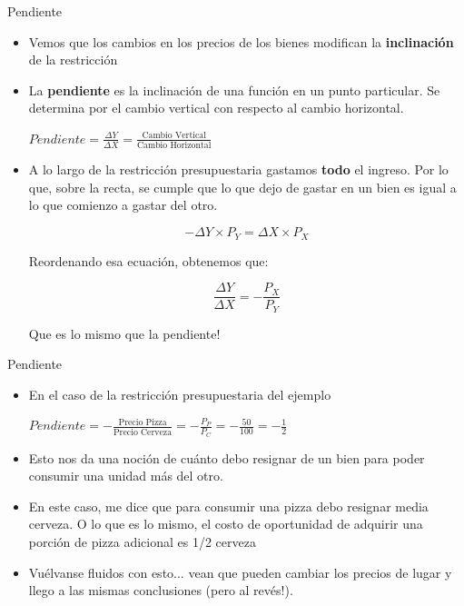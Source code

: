 \documentclass{beamer}
\begin{document}
    
\begin{frame}{Pendiente}
    \begin{itemize}
        \item Vemos que los cambios en los precios de los bienes modifican la \textbf{inclinación} de la restricción 
        \item La \textbf{pendiente} es la inclinación de una función en un punto particular. Se determina por el cambio vertical con respecto al cambio horizontal. \\ 
         \begin{center}
            $Pendiente =\frac{\Delta Y}{\Delta X} = \frac{\text{Cambio Vertical}}
        {\text{Cambio Horizontal}}$
        \end{center}
        \vspace{1mm}
        \item A lo largo de la restricción presupuestaria gastamos \textbf{todo} el ingreso. Por lo que, sobre la recta, se cumple que lo que dejo de gastar en un bien es igual a lo que comienzo a gastar del otro. 
        \vspace{-7mm}
        \begin{center}
        \[-\Delta Y \times P_Y = \Delta X \times P_X \]
        \end{center}
        \vspace{-4mm}
        Reordenando esa ecuación, obtenemos que:     \vspace{-5mm}
        \begin{center}
        \[\frac{\Delta Y}{\Delta X} = -\frac{P_X}{P_Y} \]
        \end{center}
        Que es lo mismo que la pendiente!
    
    \end{itemize} 
\end{frame}
    
\begin{frame}{Pendiente}
    \begin{itemize}
        \item En el caso de la restricción presupuestaria del ejemplo \\
        \vspace{2mm}
        \begin{center}
            $Pendiente = - \frac{\text{Precio Pizza}}{\text{Precio Cerveza}}= -\frac{P_P}{P_C} = -\frac{50}{100} = -\frac{1}{2}$
        \end{center}
        \vspace{2mm}
        \item Esto nos da una noción de cuánto debo resignar de un bien para poder consumir una unidad más del otro.
        \item En este caso, me dice que para consumir una pizza debo resignar media cerveza. O lo que es lo mismo, el costo de oportunidad de adquirir una porción de pizza adicional es 1/2 cerveza
        \item Vuélvanse fluidos con esto... vean que pueden cambiar los precios de lugar y llego a las mismas conclusiones (pero al revés!).
    \end{itemize}
\end{frame}
    
\end{document}
